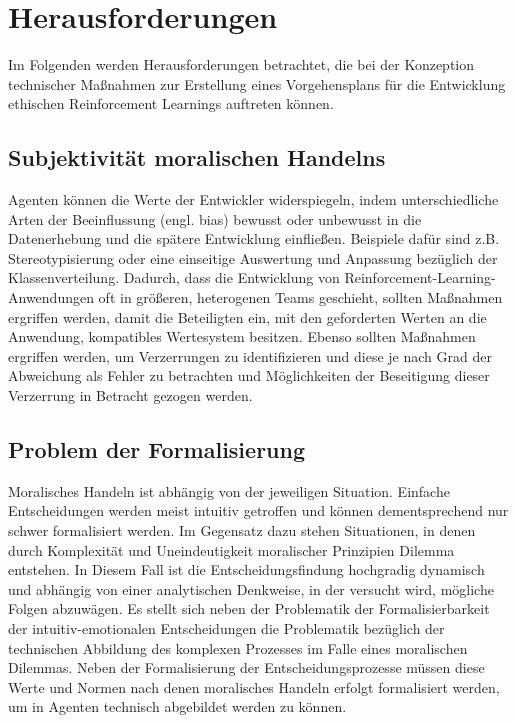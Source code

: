 \section{Herausforderungen}\label{sec:Herausforderungen}
Im Folgenden werden Herausforderungen betrachtet, die bei der Konzeption technischer Maßnahmen zur Erstellung eines Vorgehensplans für die Entwicklung ethischen Reinforcement Learnings auftreten können.

\subsection{Subjektivität moralischen Handelns}
Agenten können die Werte der Entwickler widerspiegeln, indem unterschiedliche Arten der Beeinflussung (engl. bias) \cite{sengupta2018} bewusst oder unbewusst in die Datenerhebung und die spätere Entwicklung einfließen.
Beispiele dafür sind z.B. Stereotypisierung oder eine einseitige Auswertung und Anpassung bezüglich der Klassenverteilung.
Dadurch, dass die Entwicklung von Reinforcement-Learning-Anwendungen oft in größeren, heterogenen Teams geschieht, sollten Maßnahmen ergriffen werden, damit die Beteiligten ein, mit den geforderten Werten an die Anwendung, kompatibles Wertesystem besitzen.
Ebenso sollten Maßnahmen ergriffen werden, um Verzerrungen zu identifizieren und diese je nach Grad der Abweichung als Fehler zu betrachten und Möglichkeiten der Beseitigung dieser Verzerrung in Betracht gezogen werden.

\subsection{Problem der Formalisierung}
Moralisches Handeln ist abhängig von der jeweiligen Situation.
Einfache Entscheidungen werden meist intuitiv getroffen und können dementsprechend nur schwer formalisiert werden.
Im Gegensatz dazu stehen Situationen, in denen durch Komplexität und Uneindeutigkeit moralischer Prinzipien Dilemma \cite[S. 300]{moll2003} entstehen.
In Diesem Fall ist die Entscheidungsfindung hochgradig dynamisch und abhängig von einer analytischen Denkweise, in der versucht wird, mögliche Folgen abzuwägen.
Es stellt sich neben der Problematik der Formalisierbarkeit der intuitiv-emotionalen Entscheidungen die Problematik bezüglich der technischen Abbildung des komplexen Prozesses im Falle eines moralischen Dilemmas.
Neben der Formalisierung der Entscheidungsprozesse müssen diese Werte und Normen nach denen moralisches Handeln erfolgt formalisiert werden, um in Agenten technisch abgebildet werden zu können.

